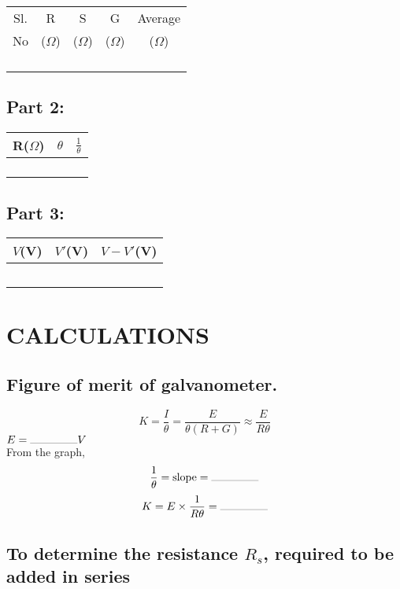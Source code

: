 \documentclass[11pt,a4paper]{article}
\begin{document}
	\begin{tabular}{|c|c|c|c|c|}
		\hline
		Sl.& R& S& G& Average\\
		No& ($\Omega$)&($\Omega$)&($\Omega$)&($\Omega$) \\
		\hline
		&&&&\\
		&&&&\\
		&&&&\\
		&&&&\\
		\hline
	\end{tabular}
	\subsection{Part 2:}
	\begin{tabular}{|c|c|c|}
		\hline
		R($\Omega$)& $\theta$& $\frac{1}{\theta}$\\
		\hline
		&&\\&&\\&&\\&&\\
		\hline
	\end{tabular}
	\subsection{Part 3:}
	\begin{tabular}{|c|c|c|}
		\hline
		$V$(V)& $V'$(V)& $V-V'$(V)\\
		\hline
		&&\\&&\\&&\\&&\\&&\\ \hline
	\end{tabular}
	
	\section{CALCULATIONS}
	\subsection{Figure of merit of galvanometer.}
		
	$$ K = \dfrac{I}{\theta} = \dfrac{E}{\theta(R+G)} \approx \dfrac{E}{R\theta}$$
	$E =\rule{10ex}{0.2pt} V $\\

	From the graph, \\ 
	$$\dfrac{1}{\theta} = \text{slope} =\rule{10ex}{0.2pt}$$ 
	$$ K = E \times \dfrac{1}{R\theta} = \rule{10ex}{0.2pt}$$
	\subsection{To determine the resistance $R_s$, required to be added in series}
	
\end{document}
